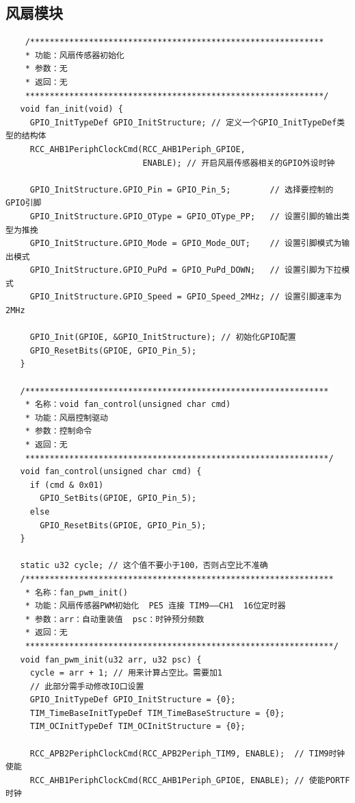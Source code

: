 \subsection{风扇模块}

\begin{lstlisting}
    /************************************************************
    * 功能：风扇传感器初始化
    * 参数：无
    * 返回：无
    *************************************************************/
   void fan_init(void) {
     GPIO_InitTypeDef GPIO_InitStructure; // 定义一个GPIO_InitTypeDef类型的结构体
     RCC_AHB1PeriphClockCmd(RCC_AHB1Periph_GPIOE,
                            ENABLE); // 开启风扇传感器相关的GPIO外设时钟

     GPIO_InitStructure.GPIO_Pin = GPIO_Pin_5;        // 选择要控制的GPIO引脚
     GPIO_InitStructure.GPIO_OType = GPIO_OType_PP;   // 设置引脚的输出类型为推挽
     GPIO_InitStructure.GPIO_Mode = GPIO_Mode_OUT;    // 设置引脚模式为输出模式
     GPIO_InitStructure.GPIO_PuPd = GPIO_PuPd_DOWN;   // 设置引脚为下拉模式
     GPIO_InitStructure.GPIO_Speed = GPIO_Speed_2MHz; // 设置引脚速率为2MHz

     GPIO_Init(GPIOE, &GPIO_InitStructure); // 初始化GPIO配置
     GPIO_ResetBits(GPIOE, GPIO_Pin_5);
   }

   /**************************************************************
    * 名称：void fan_control(unsigned char cmd)
    * 功能：风扇控制驱动
    * 参数：控制命令
    * 返回：无
    **************************************************************/
   void fan_control(unsigned char cmd) {
     if (cmd & 0x01)
       GPIO_SetBits(GPIOE, GPIO_Pin_5);
     else
       GPIO_ResetBits(GPIOE, GPIO_Pin_5);
   }

   static u32 cycle; // 这个值不要小于100，否则占空比不准确
   /***************************************************************
    * 名称：fan_pwm_init()
    * 功能：风扇传感器PWM初始化  PE5 连接 TIM9——CH1  16位定时器
    * 参数：arr：自动重装值  psc：时钟预分频数
    * 返回：无
    ***************************************************************/
   void fan_pwm_init(u32 arr, u32 psc) {
     cycle = arr + 1; // 用来计算占空比。需要加1
     // 此部分需手动修改IO口设置
     GPIO_InitTypeDef GPIO_InitStructure = {0};
     TIM_TimeBaseInitTypeDef TIM_TimeBaseStructure = {0};
     TIM_OCInitTypeDef TIM_OCInitStructure = {0};

     RCC_APB2PeriphClockCmd(RCC_APB2Periph_TIM9, ENABLE);  // TIM9时钟使能
     RCC_AHB1PeriphClockCmd(RCC_AHB1Periph_GPIOE, ENABLE); // 使能PORTF时钟


\end{lstlisting}

